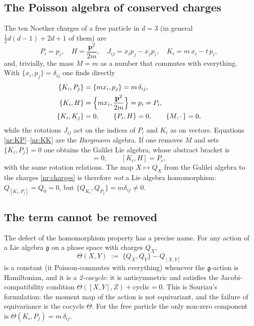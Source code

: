 \subsection{The Poisson algebra of conserved charges}

The ten Noether charges of a free particle in $d=3$ (in general
$\tfrac12 d(d-1)+2d+1$ of them) are
\begin{equation}
  P_i=p_i,\quad H=\frac{\mathbf{p}^2}{2m},\quad
  J_{ij}=x_ip_j-x_jp_i,\quad K_i=m\,x_i-t\,p_i ,
  \label{nr:charges}
\end{equation}
and, trivially, the mass $M=m$ as a number that commutes with everything. With
$\{x_i,p_j\}=\delta_{ij}$ one finds directly
\begin{align}
  \{K_i,P_j\} &= \{m x_i,p_j\} = m\,\delta_{ij}, \label{nr:KP}\\
  \{K_i,H\}   &= \Bigl\{m x_i,\frac{\mathbf{p}^2}{2m}\Bigr\} = p_i = P_i, \label{nr:KH}\\
  \{K_i,K_j\} &= 0, \qquad \{P_i,H\}=0,\qquad \{M,\cdot\,\}=0, \label{nr:KK}
\end{align}
while the rotations $J_{ij}$ act on the indices of $P_i$ and $K_i$ as on
vectors. Equations \eqref{nr:KP}--\eqref{nr:KK} are the \emph{Bargmann}
algebra. If one removes $M$ and sets $\{K_i,P_j\}=0$ one obtains the Galilei
Lie algebra, whose abstract bracket is
\begin{equation}
  [K_i,P_j]=0,\qquad [K_i,H]=P_i ,
  \label{nr:galilei}
\end{equation}
with the same rotation relations. The map $X\mapsto Q_X$ from the Galilei
algebra to the charges \eqref{nr:charges} is therefore \emph{not} a Lie algebra
homomorphism: $Q_{[K_i,P_j]}=Q_0=0$, but $\{Q_{K_i},Q_{P_j}\}=m\delta_{ij}\neq0$.

\subsection{The term cannot be removed}

The defect of the homomorphism property has a precise name. For any
action of a Lie algebra $\mathfrak{g}$ on a phase space with charges $Q_X$,
\begin{equation}
  \Theta(X,Y)\;:=\;\{Q_X,Q_Y\}-Q_{[X,Y]}
  \label{nr:theta}
\end{equation}
is a constant (it Poisson-commutes with everything) whenever the
$\mathfrak{g}$-action is Hamiltonian, and it is a \emph{2-cocycle}: it is
antisymmetric and satisfies the Jacobi-compatibility condition
$\Theta([X,Y],Z)+\text{cyclic}=0$. This is Souriau's formulation: the moment
map of the action is not equivariant, and the failure of equivariance is the
cocycle $\Theta$. For the free particle the only non-zero component is
$\Theta(K_i,P_j)=m\,\delta_{ij}$.


